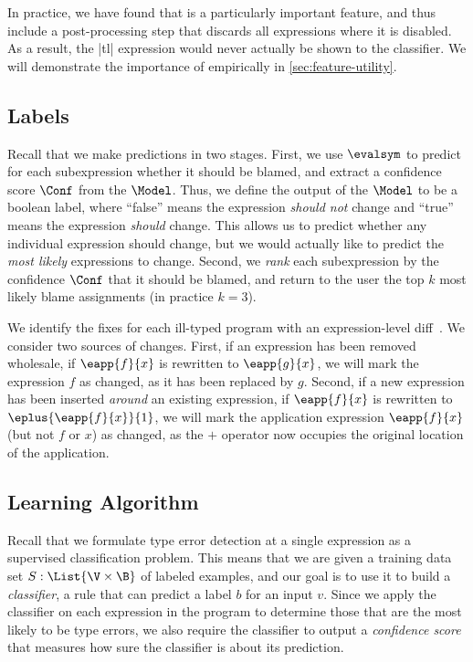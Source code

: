 In practice, we have found that \InSlice is a particularly important feature,
and thus include a post-processing step that discards all expressions where it
is disabled. As a result, the |tl| expression would never actually be shown to
the classifier. We will demonstrate the importance of \InSlice empirically in
\autoref{sec:feature-utility}.


\subsection{Labels}
\label{sec:labels}
Recall that we make predictions in two stages. First, we use $\evalsym$ to
predict for each subexpression whether it should be blamed, and extract a
confidence score $\Conf$ from the $\Model$. Thus, we define the output of the
$\Model$ to be a boolean label, where ``false'' means the expression
\emph{should not} change and ``true'' means the expression \emph{should} change.
This allows us to predict whether any individual expression should change, but
we would actually like to predict the \emph{most likely} expressions to change.
Second, we \emph{rank} each subexpression by the confidence $\Conf$ that it
should be blamed, and return to the user the top $k$ most likely blame
assignments (in practice $k=3$).


We identify the fixes for each ill-typed program with an expression-level
diff~\citep{Lempsink2009-xf}. We consider two sources of changes. First, if an
expression has been removed wholesale, \eg if $\eapp{f}{x}$ is rewritten to
$\eapp{g}{x}$, we will mark the expression $f$ as changed, as it has been
replaced by $g$. Second, if a new expression has been inserted \emph{around} an
existing expression, \eg if $\eapp{f}{x}$ is rewritten to
$\eplus{\eapp{f}{x}}{1}$, we will mark the application expression $\eapp{f}{x}$
(but not $f$ or $x$) as changed, as the $+$ operator now occupies the original
location of the application.


\subsection{Learning Algorithm}
\label{sec:models}
\lstDeleteShortInline{|} %

Recall that we formulate type error detection at a single expression as a
supervised classification problem. This means that we are given a training data
set
$S : \List{\V \times \B}$ of labeled examples, and our goal is to use it to
build a \emph{classifier}, \ie a rule that can predict a label $b$ for an input
$v$. Since we apply the classifier on each expression in the program to
determine those that are the most likely to be type errors, we also require the
classifier to output a \emph{confidence score} that measures how sure the
classifier is about its prediction.


